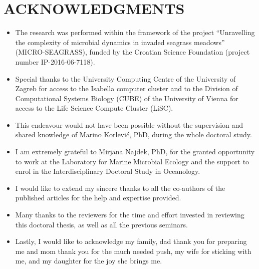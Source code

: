 \documentclass[
  12 pt,
]{book}
\begin{document}

\hypertarget{acknowledgments}{%
\section*{ACKNOWLEDGMENTS}\label{acknowledgments}}

\begin{itemize}
\item
  The research was performed within the framework of the project ``Unravelling the complexity of microbial dynamics in invaded seagrass meadows'' (MICRO-SEAGRASS), funded by the Croatian Science Foundation (project number IP-2016-06-7118).
\item
  Special thanks to the University Computing Centre of the University of Zagreb for access to the Isabella computer cluster and to the Division of Computational Systems Biology (CUBE) of the University of Vienna for access to the Life Science Compute Cluster (LiSC).
\item
  This endeavour would not have been possible without the supervision and shared knowledge of Marino Korlević, PhD, during the whole doctoral study.
\item
  I am extremely grateful to Mirjana Najdek, PhD, for the granted opportunity to work at the Laboratory for Marine Microbial Ecology and the support to enrol in the Interdisciplinary Doctoral Study in Oceanology.
\item
  I would like to extend my sincere thanks to all the co-authors of the published articles for the help and expertise provided.
\item
  Many thanks to the reviewers for the time and effort invested in reviewing this doctoral thesis, as well as all the previous seminars.
\item
  Lastly, I would like to acknowledge my family, dad thank you for preparing me and mom thank you for the much needed push, my wife for sticking with me, and my daughter for the joy she brings me.
\end{itemize}

\clearpage


\end{document}
